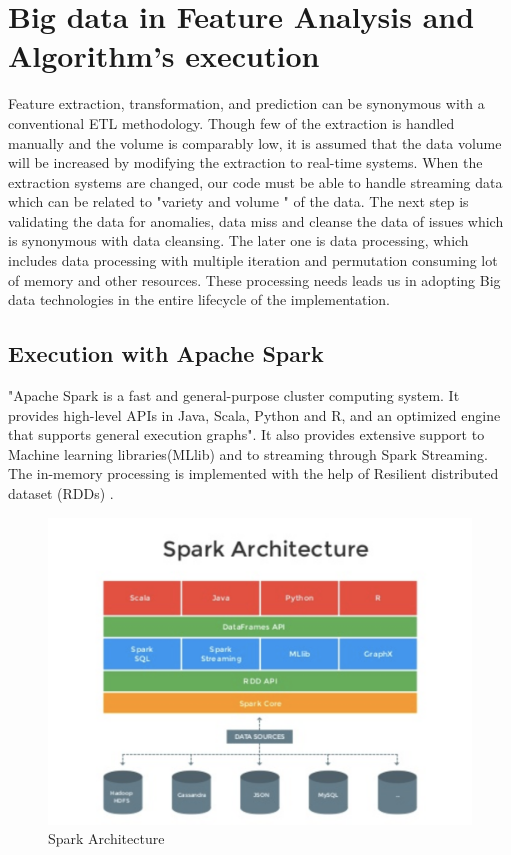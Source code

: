 \documentclass[sigconf]{acmart}
\begin{document}
\section{Big data in Feature Analysis and Algorithm's execution}
Feature extraction, transformation, and prediction can be synonymous with a conventional ETL methodology. Though few of the extraction is handled manually and the volume is comparably low, it is assumed that the data volume will be increased by modifying the extraction to real-time systems. When the extraction systems are changed, our code must be able to handle streaming data which can be related to "variety and volume " of the data. The next step is validating the data for anomalies, data miss and cleanse the data of issues which is synonymous with data cleansing. The later one is data processing, which includes data processing with multiple iteration and permutation consuming lot of memory and other resources. These processing needs leads us in adopting Big data technologies in the entire lifecycle of the implementation.

\subsection{Execution with Apache Spark}
"Apache Spark is a fast and general-purpose cluster computing system. It provides high-level APIs in Java, Scala, Python and R, and an optimized engine that supports general execution graphs". It also provides extensive support to Machine learning libraries(MLlib) and to streaming through Spark Streaming. The in-memory processing is implemented with the help of Resilient distributed dataset (RDDs) \cite{5:online}.

\begin{figure}[!ht]
  \centering\includegraphics[width=\columnwidth]{images/Sparkarchic.png}
  \caption{Spark Architecture}
\end{figure}
\end{document}
